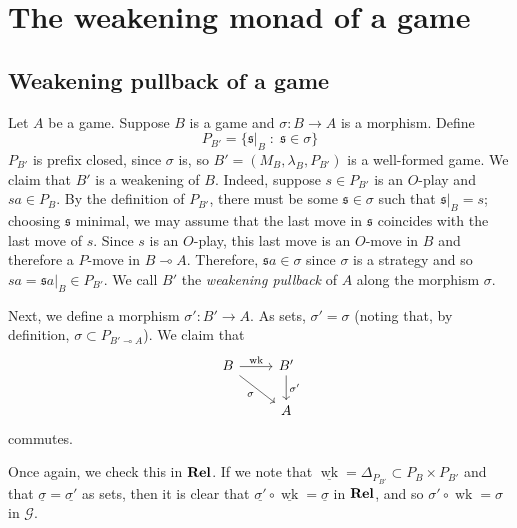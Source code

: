 \documentclass[11pt]{article} %
\theoremstyle{plain} %
\theoremstyle{definition} %
\theoremstyle{exercisestyle}
\newcommand{\catname}[1]{{\normalfont\textbf{#1}}}
\newcommand{\Rel}{\catname{Rel}}
\newcommand*\from{\colon}
\newcommand{\cmap}[3]{#1\from{}#2\to{}#3}
\renewcommand{\implies}{\multimap}
\newcommand{\comp}[2]{#1 \circ #2}
\newcommand{\G}{\mathcal G}
\newcommand{\suchthat}{\;\colon\;}
\DeclareMathOperator{\wk}{wk}
\newcommand{\s}{\mathfrak{s}}
\newcommand{\grel}[1]{\underline{#1}}
\begin{document}
\section{The weakening monad of a game}

\subsection{Weakening pullback of a game}

Let $A$ be a game.  Suppose $B$ is a game and $\cmap{\sigma}{B}{A}$ is a morphism.  Define
\[
  P_{B'}=\{\s\vert_B\suchthat \s\in\sigma\}
  \]
$P_{B'}$ is prefix closed, since $\sigma$ is, so $B'=(M_B, \lambda_B, P_{B'})$ is a well-formed game.  We claim that $B'$ is a weakening of $B$.  Indeed, suppose $s\in P_{B'}$ is an $O$-play and $sa\in P_B$.  By the definition of $P_{B'}$, there must be some $\s\in\sigma$ such that $\s\vert_B=s$; choosing $\s$ minimal, we may assume that the last move in $\s$ coincides with the last move of $s$.  Since $s$ is an $O$-play, this last move is an $O$-move in $B$ and therefore a $P$-move in $B\implies A$.  Therefore, $\s a\in \sigma$ since $\sigma$ is a strategy and so $sa=\s a\vert_B\in P_{B'}$.  We call $B'$ the \emph{weakening pullback} of $A$ along the morphism $\sigma$.

Next, we define a morphism $\cmap{\sigma'}{B'}{A}$.  As sets, $\sigma'=\sigma$ (noting that, by definition, $\sigma\subset P_{B'\implies A}$).  We claim that
\[
  \begin{tikzcd}
    B \arrow[r, "\wk"] \arrow[dr, "\sigma"']
      & B' \arrow[d, "\sigma'"] \\
      & A
  \end{tikzcd}
  \]
commutes.

Once again, we check this in $\Rel$.  If we note that $\grel\wk=\Delta_{P_{B'}}\subset P_B\times P_{B'}$ and that $\grel\sigma=\grel{\sigma'}$ as sets, then it is clear that $\comp{\grel{\sigma'}}{\grel\wk}=\grel\sigma$ in $\Rel$, and so $\comp{\sigma'}{\wk}=\sigma$ in $\G$.
\end{document}
